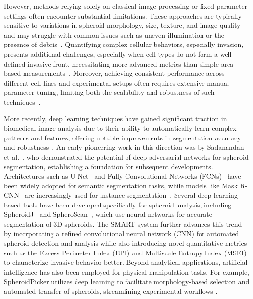 \documentclass[preprint,12pt]{elsarticle}
\begin{document}
However, methods relying solely on classical image processing or fixed parameter settings often encounter substantial limitations. These approaches are typically sensitive to variations in spheroid morphology, size, texture, and image quality and may struggle with common issues such as uneven illumination or the presence of debris~\cite{2014AMIDA}. Quantifying complex cellular behaviors, especially invasion, presents additional challenges, especially when cell types do not form a well-defined invasive front, necessitating more advanced metrics than simple area-based measurements~\cite{2016Castillo}. Moreover, achieving consistent performance across different cell lines and experimental setups often requires extensive manual parameter tuning, limiting both the scalability and robustness of such techniques~\cite{2014AMIDA}.

More recently, deep learning techniques have gained significant traction in biomedical image analysis due to their ability to automatically learn complex patterns and features, offering notable improvements in segmentation accuracy and robustness~\cite{2025Mali,2023deepsw,2021SpheroidJ,2023spheroscan}. An early pioneering work in this direction was by Sadanandan et al.~\cite{2017sadanandan}, who demonstrated the potential of deep adversarial networks for spheroid segmentation, establishing a foundation for subsequent developments. Architectures such as U-Net~\cite{unet} and Fully Convolutional Networks (FCNs)~\cite{Long2015} have been widely adopted for semantic segmentation tasks, while models like Mask R-CNN~\cite{He2017} are increasingly used for instance segmentation~\cite{2021spheroidpicker,2021SpheroidJ,2023spheroscan}. Several deep learning-based tools have been developed specifically for spheroid analysis, including SpheroidJ~\cite{2021SpheroidJ} and SpheroScan~\cite{2023spheroscan}, which use neural networks for accurate segmentation of 3D spheroids. The SMART system \cite{2021smart} further advances this trend by incorporating a refined convolutional neural network (CNN) for automated spheroid detection and analysis while also introducing novel quantitative metrics such as the Excess Perimeter Index (EPI) and Multiscale Entropy Index (MSEI) to characterize invasive behavior better. Beyond analytical applications, artificial intelligence has also been employed for physical manipulation tasks. For example, SpheroidPicker utilizes deep learning to facilitate morphology-based selection and automated transfer of spheroids, streamlining experimental workflows \cite{2021spheroidpicker}.
\end{document}
